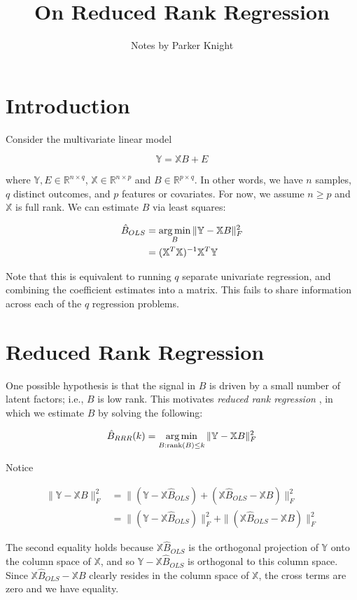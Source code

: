 \documentclass{article}
\title{On Reduced Rank Regression}
\author{Notes by Parker Knight}
\newcommand{\rank}{\textrm{rank}}
\newcommand{\R}{\mathbb{R}}
\newcommand{\X}{\mathbb{X}}
\newcommand{\Y}{\mathbb{Y}}
\newcommand{\argmin}{\mathop{\rm arg\,min}}
\begin{document}
\maketitle

\section{Introduction}

Consider the multivariate linear model

$$\Y = \X B + E$$

where $\Y,E \in \R^{n \times q}$, $\X \in \R^{n \times p}$ and $B \in \R^{p
\times q}$. In other words, we have $n$ samples, $q$ distinct outcomes, and $p$
features or covariates. For now, we assume $n \geq p$ and $\X$ is full rank. We
can estimate $B$ via least squares:

\begin{align*}
	\hat{B}_{OLS} &= \argmin_{B}\|\Y - \X B \|_F^2 \\
	&= (\X^T\X)^{-1}\X^T\Y
\end{align*}

Note that this is equivalent to running $q$ separate univariate regression, and
combining the coefficient estimates into a matrix. This fails to share
information across each of the $q$ regression problems. 

\section{Reduced Rank Regression}

One possible hypothesis is that
the signal in $B$ is driven by a small number of latent factors; i.e., $B$ is
low rank. This motivates \textit{reduced rank regression} \cite{izenman_reduced-rank_1975}, in which we estimate
$B$ by solving the following:

$$\hat{B}_{RRR}(k) = \argmin_{B: \rank(B) \leq k}\|\Y - \X B \|_F^2$$

Notice

\begin{align*}
	\|\Y - \X B \|_F^2 &= \| (\Y - \X \hat{B}_{OLS}) + (\X \hat{B}_{OLS} - \X B) \|_F^2 \\
	&= \| (\Y - \X \hat{B}_{OLS})\|_F^2 + \| (\X \hat{B}_{OLS} - \X B) \|_F^2
\end{align*}

The second equality holds because $\X \hat{B}_{OLS}$ is the orthogonal
projection of $\Y$ onto the column space of $\X$, and so $\Y - \X \hat{B}_{OLS}$
is orthogonal to this column space. Since $\X \hat{B}_{OLS} - \X
B$ clearly resides in the column space of $\X$, the cross terms are zero and we
have equality.
\end{document}

